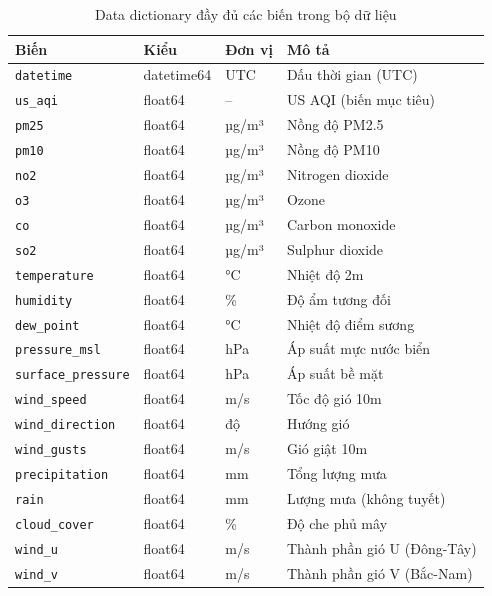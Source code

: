 \documentclass[12pt,a4paper]{report}
\begin{document}
\begin{table}[H]
\centering
\caption{Data dictionary đầy đủ các biến trong bộ dữ liệu}
\label{tab:data_dict_full}
\small
\begin{tabular}{llll}
\toprule
\textbf{Biến} & \textbf{Kiểu} & \textbf{Đơn vị} & \textbf{Mô tả} \\
\midrule
\texttt{datetime}           & datetime64 & UTC    & Dấu thời gian (UTC) \\
\texttt{us\_aqi}            & float64    & --     & US AQI (biến mục tiêu) \\
\texttt{pm25}               & float64    & µg/m³  & Nồng độ PM2.5 \\
\texttt{pm10}               & float64    & µg/m³  & Nồng độ PM10 \\
\texttt{no2}                & float64    & µg/m³  & Nitrogen dioxide \\
\texttt{o3}                 & float64    & µg/m³  & Ozone \\
\texttt{co}                 & float64    & µg/m³  & Carbon monoxide \\
\texttt{so2}                & float64    & µg/m³  & Sulphur dioxide \\
\texttt{temperature}        & float64    & °C     & Nhiệt độ 2m \\
\texttt{humidity}           & float64    & \%     & Độ ẩm tương đối \\
\texttt{dew\_point}         & float64    & °C     & Nhiệt độ điểm sương \\
\texttt{pressure\_msl}      & float64    & hPa    & Áp suất mực nước biển \\
\texttt{surface\_pressure}  & float64    & hPa    & Áp suất bề mặt \\
\texttt{wind\_speed}        & float64    & m/s    & Tốc độ gió 10m \\
\texttt{wind\_direction}    & float64    & độ     & Hướng gió \\
\texttt{wind\_gusts}        & float64    & m/s    & Gió giật 10m \\
\texttt{precipitation}      & float64    & mm     & Tổng lượng mưa \\
\texttt{rain}               & float64    & mm     & Lượng mưa (không tuyết) \\
\texttt{cloud\_cover}       & float64    & \%     & Độ che phủ mây \\
\texttt{wind\_u}            & float64    & m/s    & Thành phần gió U (Đông-Tây) \\
\texttt{wind\_v}            & float64    & m/s    & Thành phần gió V (Bắc-Nam) \\

\end{tabular}
\end{table}
\end{document}
